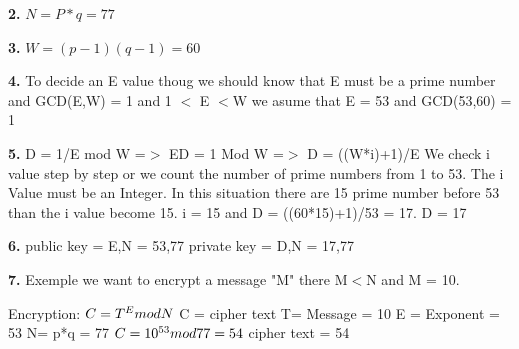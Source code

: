 \documentclass{article}
\begin{document}
        \textbf{2.}\newline
        \begin{math}
         N = P*q = 77 
        \end{math} \newline
        
        \textbf{3.}\newline
        \begin{math}
         W = (p-1)(q-1) = 60
        \end{math}\newline
        
        \textbf{4.}\newline
        To decide an E value thoug we should know that E must be a prime number and GCD(E,W) = 1  and 1 $<$ E $<$W
        we asume that E = 53 and GCD(53,60) = 1\newline
        
        \textbf{5.}\newline
         D = 1/E mod W =$>$ ED = 1 Mod W  =$>$ D = ((W*i)+1)/E\newline
        We check i value step by step or we count the number of prime numbers from 1 to 53. The i Value must be an Integer.
        In this situation there are 15 prime number before 53 than the i value become 15.\newline
        i = 15 and D = ((60*15)+1)/53 = 17.  D = 17\newline
        
        \textbf{6.}\newline
        public key = {E,N} = {53,77}\newline   
        private key = {D,N} = {17,77}\newline
        
        \textbf{7.}\newline
        Exemple we want to encrypt a message "M" there M$<$N and  M = 10.\newline
        
        Encryption:\newline
        \begin{math}
            C = T ^ E mod N \newline 
        \end{math}
            C = cipher text\newline
            T= Message = 10\newline
            E = Exponent = 53\newline
            N= p*q = 77\newline
        \begin{math}
            C = 10^{53}mod77  = 54\newline 
        \end{math}
            cipher text = 54\newline
        
\end{document}

